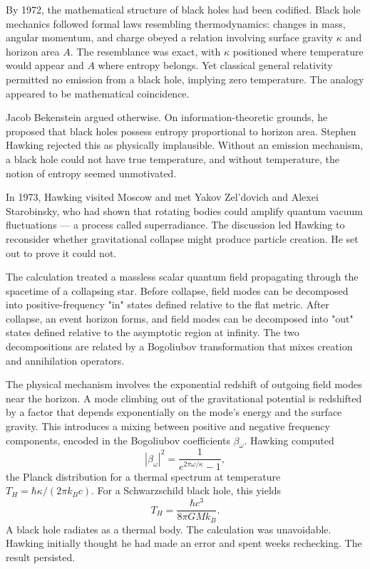 \begin{commentary}
By 1972, the mathematical structure of black holes had been codified. Black hole mechanics followed formal laws resembling thermodynamics: changes in mass, angular momentum, and charge obeyed a relation involving surface gravity $\kappa$ and horizon area $A$. The resemblance was exact, with $\kappa$ positioned where temperature would appear and $A$ where entropy belongs. Yet classical general relativity permitted no emission from a black hole, implying zero temperature. The analogy appeared to be mathematical coincidence.

Jacob Bekenstein argued otherwise. On information-theoretic grounds, he proposed that black holes possess entropy proportional to horizon area. Stephen Hawking rejected this as physically implausible. Without an emission mechanism, a black hole could not have true temperature, and without temperature, the notion of entropy seemed unmotivated.

In 1973, Hawking visited Moscow and met Yakov Zel'dovich and Alexei Starobinsky, who had shown that rotating bodies could amplify quantum vacuum fluctuations — a process called superradiance. The discussion led Hawking to reconsider whether gravitational collapse might produce particle creation. He set out to prove it could not.

The calculation treated a massless scalar quantum field propagating through the spacetime of a collapsing star. Before collapse, field modes can be decomposed into positive-frequency "in" states defined relative to the flat metric. After collapse, an event horizon forms, and field modes can be decomposed into "out" states defined relative to the asymptotic region at infinity. The two decompositions are related by a Bogoliubov transformation that mixes creation and annihilation operators.

The physical mechanism involves the exponential redshift of outgoing field modes near the horizon. A mode climbing out of the gravitational potential is redshifted by a factor that depends exponentially on the mode's energy and the surface gravity. This introduces a mixing between positive and negative frequency components, encoded in the Bogoliubov coefficients $\beta_\omega$. Hawking computed
\[
|\beta_\omega|^2 = \frac{1}{e^{2\pi\omega/\kappa} - 1},
\]
the Planck distribution for a thermal spectrum at temperature $T_H = \hbar\kappa/(2\pi k_B c)$. For a Schwarzschild black hole, this yields
\[
T_H = \frac{\hbar c^3}{8\pi G M k_B}.
\]
A black hole radiates as a thermal body. The calculation was unavoidable. Hawking initially thought he had made an error and spent weeks rechecking. The result persisted.


\end{commentary}
